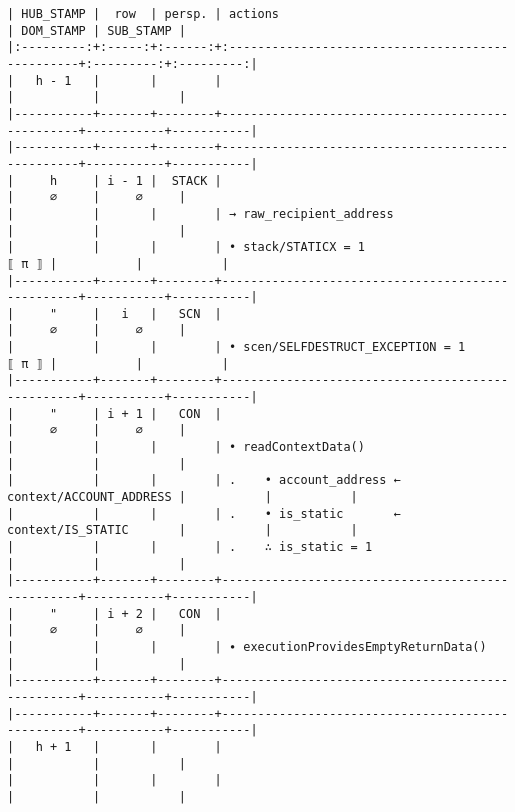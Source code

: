 \documentclass[varwidth=\maxdimen,margin=0.5cm,multi={verbatim}]{standalone}
\begin{document}
\begin{verbatim}
| HUB_STAMP |  row  | persp. | actions                                          | DOM_STAMP | SUB_STAMP |
|:---------:+:-----:+:------:+:-------------------------------------------------+:---------:+:---------:|
|   h - 1   |       |        |                                                  |           |           |
|-----------+-------+--------+--------------------------------------------------+-----------+-----------|
|-----------+-------+--------+--------------------------------------------------+-----------+-----------|
|     h     | i - 1 |  STACK |                                                  |     ∅     |     ∅     |
|           |       |        | → raw_recipient_address                          |           |           |
|           |       |        | • stack/STATICX = 1                        ⟦ π ⟧ |           |           |
|-----------+-------+--------+--------------------------------------------------+-----------+-----------|
|     "     |   i   |   SCN  |                                                  |     ∅     |     ∅     |
|           |       |        | • scen/SELFDESTRUCT_EXCEPTION = 1          ⟦ π ⟧ |           |           |
|-----------+-------+--------+--------------------------------------------------+-----------+-----------|
|     "     | i + 1 |   CON  |                                                  |     ∅     |     ∅     |
|           |       |        | • readContextData()                              |           |           |
|           |       |        | .    • account_address ← context/ACCOUNT_ADDRESS |           |           |
|           |       |        | .    • is_static       ← context/IS_STATIC       |           |           |
|           |       |        | .    ∴ is_static = 1                             |           |           |
|-----------+-------+--------+--------------------------------------------------+-----------+-----------|
|     "     | i + 2 |   CON  |                                                  |     ∅     |     ∅     |
|           |       |        | ∙ executionProvidesEmptyReturnData()             |           |           |
|-----------+-------+--------+--------------------------------------------------+-----------+-----------|
|-----------+-------+--------+--------------------------------------------------+-----------+-----------|
|   h + 1   |       |        |                                                  |           |           |
|           |       |        |                                                  |           |           |
\end{verbatim}
\end{document}
